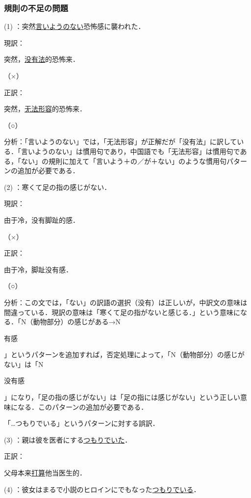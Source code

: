 \documentclass[japanese]{jnlp_1.4}
\begin{document}
\subsubsection{規則の不足の問題}

(1) ：突然\ul{言いようのない}恐怖感に襲われた．

現訳：\begin{簡体中文}突然，\ul{没有\mbox{}法}的恐怖来．\end{簡体中文}（×）

正訳：\begin{簡体中文}突然，\ul{无法形容}的恐怖来．\end{簡体中文}（○）

分析：「言いようのない」では，「无法形容」が正解だが「没有法」に訳している．「言いようのない」は慣用句であり，中国語でも「无法形容」は慣用句である，「ない」の規則に加えて「言いよう＋の／が＋ない」のような慣用句パターンの追加が必要である．

(2) ：寒くて足の指の感じがない．

現訳：\begin{簡体中文}由于冷，没有脚趾的感．\end{簡体中文}（×）

正訳：\begin{簡体中文}由于冷，脚趾没有感．\end{簡体中文}（○）

分析：この文では，「ない」の訳語の選択（没有）は正しいが，中訳文の意味は間違っている．現訳の意味は「寒くて足の指がないと感じる．」という意味になる．「N（動物部分）の感じがある→N\begin{簡体中文}有感\end{簡体中文}」というパターンを追加すれば，否定処理によって，「N（動物部分）の感じがない」は「N\begin{簡体中文}没有感\end{簡体中文}」になり，「足の指の感じがない」は「足の指には感じがない」という正しい意味になる．このパターンの追加が必要である．

「…つもりでいる」というパターンに対する誤訳．

(3) ：親は彼を医者にする\ul{つもりでいた}．

正訳：\begin{簡体中文}父母本来\ul{打算}他当医生的．\end{簡体中文}

(4) ：彼女はまるで小説のヒロインにでもなった\ul{つもりでいる}．
\end{document}
